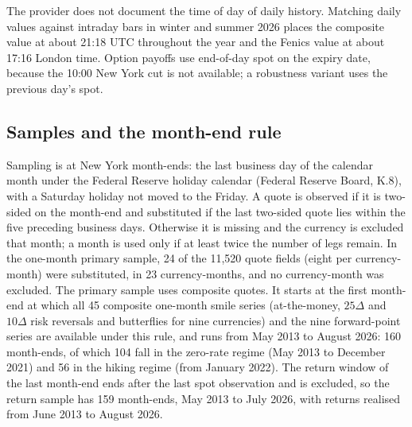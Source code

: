 \documentclass[11pt]{article}
\theoremstyle{result}
\newcommand{\D}{\Delta}
\begin{document}
The provider does not document the time of day of daily history. Matching daily values against intraday bars in winter and summer 2026 places the composite value at about 21:18 UTC throughout the year and the Fenics value at about 17:16 London time. Option payoffs use end-of-day spot on the expiry date, because the 10:00 New York cut is not available; a robustness variant uses the previous day's spot.

\subsection{Samples and the month-end rule}

Sampling is at New York month-ends: the last business day of the calendar month under the Federal Reserve holiday calendar (Federal Reserve Board, K.8), with a Saturday holiday not moved to the Friday. A quote is observed if it is two-sided on the month-end and substituted if the last two-sided quote lies within the five preceding business days. Otherwise it is missing and the currency is excluded that month; a month is used only if at least twice the number of legs remain. In the one-month primary sample, 24 of the 11,520 quote fields (eight per currency-month) were substituted, in 23 currency-months, and no currency-month was excluded.
The primary sample uses composite quotes. It starts at the first month-end at which all 45 composite one-month smile series (at-the-money, $25\D$ and $10\D$ risk reversals and butterflies for nine currencies) and the nine forward-point series are available under this rule, and runs from May 2013 to August 2026: 160 month-ends, of which 104 fall in the zero-rate regime (May 2013 to December 2021) and 56 in the hiking regime (from January 2022). The return window of the last month-end ends after the last spot observation and is excluded, so the return sample has 159 month-ends, May 2013 to July 2026, with returns realised from June 2013 to August 2026.
\end{document}
